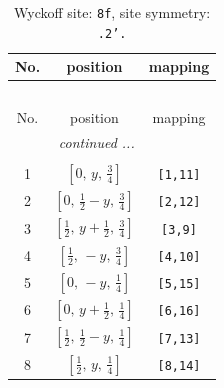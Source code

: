 \documentclass[fleqn,8pt]{jsarticle}
\begin{document}
\begin{longtable}{ccc}
\caption{Wyckoff site: {\tt 8f}, site symmetry: {\tt .2'.}}
 \\
 \hline \hline
No. & position & mapping \\ \hline \endfirsthead

\multicolumn{2}{l}{\tablename\ \thetable{}} \\
 \hline \hline
No. & position & mapping \\ \hline \endhead

 \hline \hline
\multicolumn{2}{r}{\footnotesize\it continued ...} \\ \endfoot

 \hline \hline
\multicolumn{2}{r}{} \\ \endlastfoot

1 & $\left[ 0,\, y,\, \frac{3}{4} \right]$ & {\tt [1,11]} \\ \hline
2 & $\left[ 0,\, \frac{1}{2} - y,\, \frac{3}{4} \right]$ & {\tt [2,12]} \\ \hline
3 & $\left[ \frac{1}{2},\, y + \frac{1}{2},\, \frac{3}{4} \right]$ & {\tt [3,9]} \\ \hline
4 & $\left[ \frac{1}{2},\, - y,\, \frac{3}{4} \right]$ & {\tt [4,10]} \\ \hline
5 & $\left[ 0,\, - y,\, \frac{1}{4} \right]$ & {\tt [5,15]} \\ \hline
6 & $\left[ 0,\, y + \frac{1}{2},\, \frac{1}{4} \right]$ & {\tt [6,16]} \\ \hline
7 & $\left[ \frac{1}{2},\, \frac{1}{2} - y,\, \frac{1}{4} \right]$ & {\tt [7,13]} \\ \hline
8 & $\left[ \frac{1}{2},\, y,\, \frac{1}{4} \right]$ & {\tt [8,14]} \\
\end{longtable}
\renewcommand{\arraystretch}{1.2}
\end{document}
